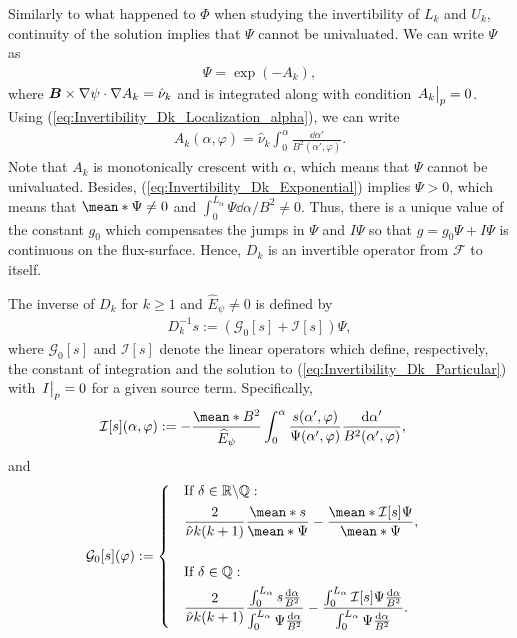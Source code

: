 \begin{enumerate}
\end{enumerate}
Similarly to what happened to $\Phi$ when studying the invertibility of $L_k$ and $U_k$, continuity of the solution implies that $\Psi$ cannot be univaluated. We can write $\Psi$ as
%
\begin{align}
	\Psi = \exp(-A_k), 
	\label{eq:Invertibility_Dk_Exponential}
\end{align}
where $\vb*{B}\times \nabla\psi \cdot \nabla A_k = \hat{\nu}_k$ and is integrated along with condition $\eval{A_k}_{p}=0$. Using (\ref{eq:Invertibility_Dk_Localization_alpha}), we can write
%
\begin{align}
	A_k(\alpha,\varphi) = \hat{\nu}_k \int_{0}^{\alpha} \frac{\dd{\alpha'}}{ B^2(\alpha',\varphi)}.
\end{align}
Note that $A_k$ is monotonically crescent with $\alpha$, which means that $\Psi $ cannot be univaluated. Besides, (\ref{eq:Invertibility_Dk_Exponential}) implies $\Psi>0$, which means that $\mean*{\Psi}\ne 0 $ and $\int_{0}^{L_\alpha}\Psi   \dd{\alpha}/  B^2 \ne 0 $. Thus, there is a unique value of the constant $g_0$ which compensates the jumps in $\Psi$ and $I\Psi$ so that $g=g_0 \Psi + I \Psi$ is continuous on the flux-surface. Hence, $D_k$ is an invertible operator from $\mathcal{F}$ to itself. 


The inverse of $D_k$ for $k \ge 1$ and $\widehat{E}_\psi \ne 0$ is defined by
%
\begin{align}
	D_k^{-1} s :=  ( \mathcal{G}_0[s] + \mathcal{I}[s] ) \Psi,
\end{align}
where $\mathcal{G}_0[s]$ and $\mathcal{I}[s]$ denote the linear operators which define, respectively, the constant of integration and the solution to (\ref{eq:Invertibility_Dk_Particular}) with $\eval{I}_{p}=0$ for a given source term. Specifically,
%
\begin{align}
	\mathcal{I}[s](\alpha,\varphi)
	& :=
	- \frac{\mean*{B^2}}{\widehat{E}_\psi}
	\int_{0}^{\alpha}
	\frac{s(\alpha',\varphi)}{\Psi(\alpha',\varphi)}
	\frac{\dd{\alpha'}}{ B^2(\alpha',\varphi)}  ,
\end{align}
and
\begin{align}
	\mathcal{G}_0[s](\varphi)
	& :=
	\begin{dcases}
		& \text{If }\delta\in\mathbb{R}\backslash\mathbb{Q}:\\
		& \frac{2}{ \hat{\nu} k (k+1) } \frac{\mean*{s}}{\mean*{\Psi} }
		- 
		\frac{\mean*{\mathcal{I}[s] \Psi}}{\mean*{\Psi} },  
		\vspace{0.5cm} \\ 
		& \text{If }\delta\in\mathbb{Q}:\\
		& \frac{2}{\hat{\nu} k(k+1)} \dfrac{\int_{0}^{L_\alpha} s \frac{\dd{\alpha}}{ B^2 }}{\int_{0}^{L_\alpha} \Psi\frac{\dd{\alpha}}{ B^2 }}
		 -      
		\dfrac{\int_{0}^{L_\alpha}   \mathcal{I}[s] \Psi  \frac{\dd{\alpha}}{ B^2 }}{\int_{0}^{L_\alpha} \Psi\frac{\dd{\alpha}}{ B^2 }} .
	\end{dcases}  
\end{align}


